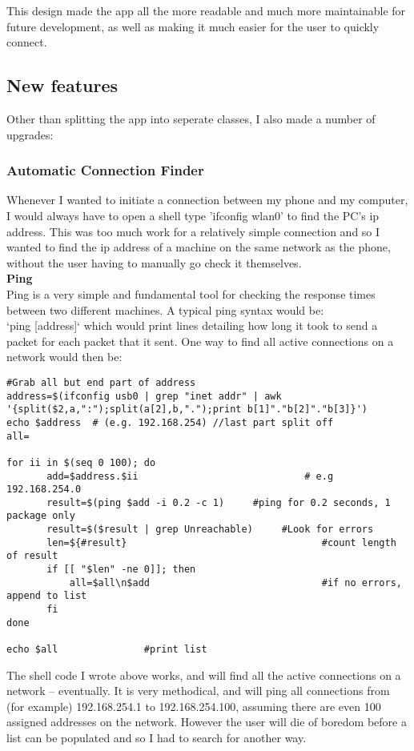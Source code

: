 This design  made the app all the more readable and much more maintainable for future development, as well as making it much easier for the user to quickly connect.

\subsection{New features}
Other than splitting the app into seperate classes, I also made a number of upgrades:

\subsubsection{Automatic Connection Finder}
Whenever I wanted to initiate a connection between my phone and my computer, I would always have to open a shell type 'ifconfig wlan0' to find the PC's ip address. This was too much work for a relatively simple connection and so I wanted to find the ip address of a machine on the same network as the phone, without the user having to manually go check it themselves.\\

{\bf Ping}\\
Ping is a very simple and fundamental tool for checking the response times between two different machines. A typical ping syntax would be:\\
`ping [address]` which would print lines detailing how long it took to send a packet for each packet that it sent.
One way to find all active connections on a network would then be:
\vspace{-15pt}
\begin{lstlisting}[title=\bf Code for pinging all addresses on a network]
#Grab all but end part of address
address=$(ifconfig usb0 | grep "inet addr" | awk '{split($2,a,":");split(a[2],b,".");print b[1]"."b[2]"."b[3]}')
echo $address  # (e.g. 192.168.254) //last part split off
all=

for ii in $(seq 0 100); do
       add=$address.$ii                             # e.g 192.168.254.0
       result=$(ping $add -i 0.2 -c 1)     #ping for 0.2 seconds, 1 package only
       result=$($result | grep Unreachable)     #Look for errors
       len=${#result}                                  #count length of result
       if [[ "$len" -ne 0]]; then                   
           all=$all\n$add                              #if no errors, append to list
       fi
done

echo $all               #print list
\end{lstlisting}
The shell code I wrote above works, and will find all the active connections on a network -- eventually. It is very methodical, and will ping all connections from (for example) 192.168.254.1 to 192.168.254.100, assuming there are even 100 assigned addresses on the network. However the user will die of boredom before a list can be populated and so I had to search for another way.\\

